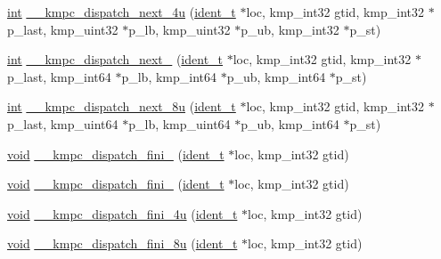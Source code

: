 \begin{DoxyCompactItemize}
\item 
\hyperlink{ittnotify__static_8h_a8b8dcd723308a8cb5d84277c7a3fff70}{int} \hyperlink{group__WORK__SHARING_ga9ef4cfec5c836de61180767240c7f380}{\-\_\-\-\_\-kmpc\-\_\-dispatch\-\_\-next\-\_\-4u} (\hyperlink{group__BASIC__TYPES_ga690fda6b92f039a72db263c6b4394ddb}{ident\-\_\-t} $\ast$loc, kmp\-\_\-int32 gtid, kmp\-\_\-int32 $\ast$p\-\_\-last, kmp\-\_\-uint32 $\ast$p\-\_\-lb, kmp\-\_\-uint32 $\ast$p\-\_\-ub, kmp\-\_\-int32 $\ast$p\-\_\-st)
\item 
\hyperlink{ittnotify__static_8h_a8b8dcd723308a8cb5d84277c7a3fff70}{int} \hyperlink{group__WORK__SHARING_gad49ead8c4196b726b6f04d4b1d53d01d}{\-\_\-\-\_\-kmpc\-\_\-dispatch\-\_\-next\-\_} (\hyperlink{group__BASIC__TYPES_ga690fda6b92f039a72db263c6b4394ddb}{ident\-\_\-t} $\ast$loc, kmp\-\_\-int32 gtid, kmp\-\_\-int32 $\ast$p\-\_\-last, kmp\-\_\-int64 $\ast$p\-\_\-lb, kmp\-\_\-int64 $\ast$p\-\_\-ub, kmp\-\_\-int64 $\ast$p\-\_\-st)
\item 
\hyperlink{ittnotify__static_8h_a8b8dcd723308a8cb5d84277c7a3fff70}{int} \hyperlink{group__WORK__SHARING_gab1eac772e1ef6ddc3a8512c00a4e78be}{\-\_\-\-\_\-kmpc\-\_\-dispatch\-\_\-next\-\_\-8u} (\hyperlink{group__BASIC__TYPES_ga690fda6b92f039a72db263c6b4394ddb}{ident\-\_\-t} $\ast$loc, kmp\-\_\-int32 gtid, kmp\-\_\-int32 $\ast$p\-\_\-last, kmp\-\_\-uint64 $\ast$p\-\_\-lb, kmp\-\_\-uint64 $\ast$p\-\_\-ub, kmp\-\_\-int64 $\ast$p\-\_\-st)
\item 
\hyperlink{ittnotify__static_8h_af941d56e55e3c5465135b60c4d6343ed}{void} \hyperlink{group__WORK__SHARING_ga5f02c0e2081859da86664bfeaec6de62}{\-\_\-\-\_\-kmpc\-\_\-dispatch\-\_\-fini\-\_} (\hyperlink{group__BASIC__TYPES_ga690fda6b92f039a72db263c6b4394ddb}{ident\-\_\-t} $\ast$loc, kmp\-\_\-int32 gtid)
\item 
\hyperlink{ittnotify__static_8h_af941d56e55e3c5465135b60c4d6343ed}{void} \hyperlink{group__WORK__SHARING_gac9f8cad27477155b583b54848887997d}{\-\_\-\-\_\-kmpc\-\_\-dispatch\-\_\-fini\-\_} (\hyperlink{group__BASIC__TYPES_ga690fda6b92f039a72db263c6b4394ddb}{ident\-\_\-t} $\ast$loc, kmp\-\_\-int32 gtid)
\item 
\hyperlink{ittnotify__static_8h_af941d56e55e3c5465135b60c4d6343ed}{void} \hyperlink{group__WORK__SHARING_gaf293aeef6b6f673f2d824171d6ec20e3}{\-\_\-\-\_\-kmpc\-\_\-dispatch\-\_\-fini\-\_\-4u} (\hyperlink{group__BASIC__TYPES_ga690fda6b92f039a72db263c6b4394ddb}{ident\-\_\-t} $\ast$loc, kmp\-\_\-int32 gtid)
\item 
\hyperlink{ittnotify__static_8h_af941d56e55e3c5465135b60c4d6343ed}{void} \hyperlink{group__WORK__SHARING_gad99af80b23202044e80aaed7d711b9ac}{\-\_\-\-\_\-kmpc\-\_\-dispatch\-\_\-fini\-\_\-8u} (\hyperlink{group__BASIC__TYPES_ga690fda6b92f039a72db263c6b4394ddb}{ident\-\_\-t} $\ast$loc, kmp\-\_\-int32 gtid)
\end{DoxyCompactItemize}
